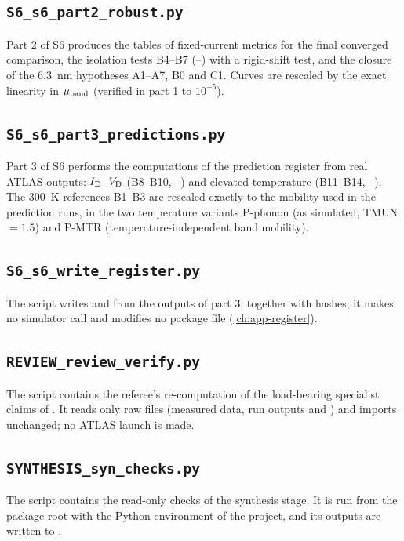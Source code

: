 \subsection{\texttt{S6\_s6\_part2\_robust.py}}
Part 2 of S6 produces the tables of fixed-current metrics for the final converged comparison, the isolation tests
B4--B7 (--) with a rigid-shift test, and the closure of the \SI{6.3}{nm} hypotheses A1--A7, B0 and
C1. Curves are rescaled by the exact linearity in $\mu_{\mathrm{band}}$ (verified in part 1 to $10^{-5}$).


\subsection{\texttt{S6\_s6\_part3\_predictions.py}}
Part 3 of S6 performs the computations of the prediction register from real ATLAS outputs: $I_{\mathrm{D}}$--$V_{\mathrm{D}}$ (B8--B10,
--) and elevated temperature (B11--B14, --). The \SI{300}{K} references B1--B3 are
rescaled exactly to the mobility used in the prediction runs, in the two temperature variants P-phonon (as simulated,
TMUN $= 1.5$) and P-MTR (temperature-independent band mobility).


\subsection{\texttt{S6\_s6\_write\_register.py}}
The script writes  and  from the outputs of part 3,
together with hashes; it makes no simulator call and modifies no package file (\cref{ch:app-register}).


\subsection{\texttt{REVIEW\_review\_verify.py}}
The script contains the referee's re-computation of the load-bearing specialist claims of . It reads only
raw files (measured data, run outputs and ) and imports  unchanged;
no ATLAS launch is made.


\subsection{\texttt{SYNTHESIS\_syn\_checks.py}}
The script contains the read-only checks of the synthesis stage. It is run from the package root with the Python
environment of the project, and its outputs are written to .


